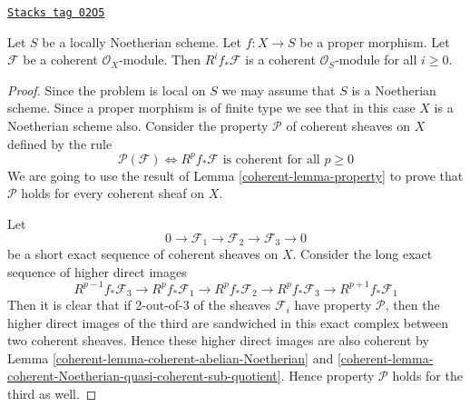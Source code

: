 \begin{proposition}
\label{coherent-proposition-proper-pushforward-coherent}
\href{https://stacks.math.columbia.edu/tag/02O5}{\texttt{Stacks tag 02O5}}

\begin{reference}
\cite[III Theorem 3.2.1]{EGA}
\end{reference}
Let $S$ be a locally Noetherian scheme.
Let $f : X \to S$ be a proper morphism.
Let $\mathcal{F}$ be a coherent $\mathcal{O}_X$-module.
Then $R^if_*\mathcal{F}$ is a coherent $\mathcal{O}_S$-module
for all $i \geq 0$.
\end{proposition}

\begin{proof}

Since the problem is local on $S$ we may assume that $S$ is
a Noetherian scheme. Since a proper morphism is of finite type
we see that in this case $X$ is a Noetherian scheme also.
Consider the property $\mathcal{P}$ of coherent sheaves
on $X$ defined by the rule
$$
\mathcal{P}(\mathcal{F}) \Leftrightarrow
R^pf_*\mathcal{F}\text{ is coherent for all }p \geq 0
$$
We are going to use the result of
Lemma \ref{coherent-lemma-property} to prove that
$\mathcal{P}$ holds for every coherent sheaf on $X$.

\medskip\noindent
Let
$$
0 \to \mathcal{F}_1 \to \mathcal{F}_2 \to \mathcal{F}_3 \to 0
$$
be a short exact sequence of coherent sheaves on $X$.
Consider the long exact sequence of higher direct images
$$
R^{p - 1}f_*\mathcal{F}_3 \to
R^pf_*\mathcal{F}_1 \to
R^pf_*\mathcal{F}_2 \to
R^pf_*\mathcal{F}_3 \to
R^{p + 1}f_*\mathcal{F}_1
$$
Then it is clear that if 2-out-of-3 of the sheaves $\mathcal{F}_i$
have property $\mathcal{P}$, then the higher direct images of the
third are sandwiched in this exact complex between two coherent
sheaves. Hence these higher direct images are also coherent by
Lemma \ref{coherent-lemma-coherent-abelian-Noetherian} and
\ref{coherent-lemma-coherent-Noetherian-quasi-coherent-sub-quotient}.
Hence property $\mathcal{P}$ holds for the third as well.


\end{proof}
